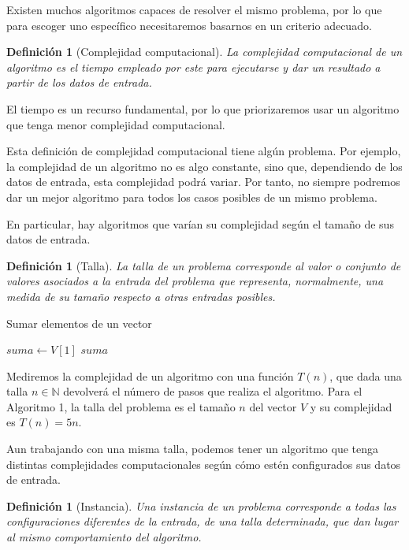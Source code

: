\documentclass[12pt,twoside]{article}
\newtheorem{definition}[theorem]{Definición}
\begin{document}
Existen muchos algoritmos capaces de resolver el mismo problema, por lo que para escoger uno específico necesitaremos basarnos en un criterio adecuado.

\begin{definition}[Complejidad computacional]
    La complejidad computacional de un algoritmo es el tiempo empleado por este para ejecutarse y dar un resultado a partir de los datos de entrada.
\end{definition}

El tiempo es un recurso fundamental, por lo que priorizaremos usar un algoritmo que tenga menor complejidad computacional.

Esta definición de complejidad computacional tiene algún problema. Por ejemplo, la complejidad de un algoritmo no es algo constante, sino que, dependiendo de los datos de entrada, esta complejidad podrá variar. Por tanto, no siempre podremos dar un mejor algoritmo para todos los casos posibles de un mismo problema.

En particular, hay algoritmos que varían su complejidad según el tamaño de sus datos de entrada.

\begin{definition}[Talla]
    La talla de un problema corresponde al valor o conjunto de valores asociados a la entrada del problema que representa, normalmente, una medida de su tamaño respecto a otras entradas posibles.
\end{definition}

\begin{algorithm}[H]
\DontPrintSemicolon
\SetAlgoLined
\caption{Sumar elementos de un vector}
\BlankLine
$suma \gets V[1]$\; 
\Return $suma$\;
\end{algorithm}

\hspace{5mm}

Mediremos la complejidad de un algoritmo con una función $T(n)$, que dada una talla $n\in\mathbb{N}$ devolverá el número de pasos que realiza el algoritmo. Para el Algoritmo 1, la talla del problema es el tamaño $n$ del vector $V$ y su complejidad es $T(n)=5n$.

Aun trabajando con una misma talla, podemos tener un algoritmo que tenga distintas complejidades computacionales según cómo estén configurados sus datos de entrada.

\begin{definition}[Instancia]
    Una instancia de un problema corresponde a todas las configuraciones diferentes de la entrada, de una talla determinada, que dan lugar al mismo comportamiento del algoritmo.
\end{definition}
\end{document}
